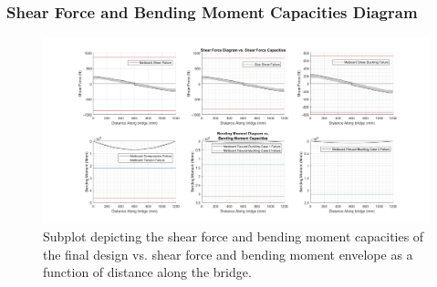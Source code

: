 \documentclass[11pt, fleqn]{article}
\begin{document}
\subsubsection{Shear Force and Bending Moment Capacities Diagram}
\begin{figure}[h]
    \centering
    \includegraphics[width=\linewidth]{../../img/final-design.jpg}
    \caption{Subplot depicting the shear force and bending moment capacities of the final design vs. shear force and bending moment envelope as a function of distance along the bridge.}
\end{figure}
\end{document}
